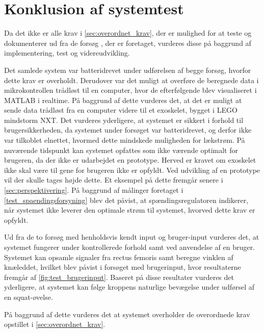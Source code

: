 \section{Konklusion af systemtest}
Da det ikke er alle krav i \autoref{sec:overordnet_krav}, der er mulighed for at teste og dokumenterer ud fra de forsøg , der er foretaget, vurderes disse på baggrund af implementering, test og videreudvikling. 

Det samlede system var batteridrevet under udførelsen af begge forsøg, hvorfor dette krav er overholdt. Derudover var det muligt at overføre de beregnede data i mikrokontrollen trådløst til en computer, hvor de efterfølgende blev visualiseret i MATLAB i realtime. På baggrund af dette vurderes det, at det er muligt at sende data trådløst fra en computer videre til et exoskelet, bygget i LEGO mindstorm NXT. Det vurderes yderligere, at systemet er sikkert i forhold til brugersikkerheden, da systemet under forsøget var batteridrevet, og derfor ikke var tilkoblet elnettet, hvormed dette mindskede muligheden for lækstrøm. 
På nuværende tidspunkt kan systemet opfattes som ikke værende optimalt for brugeren, da der ikke er udarbejdet en prototype. Herved er kravet om exoskelet ikke skal være til gene for brugeren ikke er opfyldt. Ved udvikling af en prototype vil der skulle tages højde dette. Et eksempel på dette fremgår senere i \autoref{sec:perspektivering}. 
På baggrund af målinger foretaget i \autoref{test_spaendingsforsyning} blev det påvist, at spændingsregulatoren indikerer, når systemet ikke leverer den optimale strøm til systemet, hvorved dette krav er opfyldt. 

Ud fra de to forsøg med henholdsvis kendt input og bruger-input vurderes det, at systemet fungerer under kontrollerede forhold samt ved anvendelse af en bruger. Systemet kan opsamle signaler fra rectus femoris samt beregne vinklen af knæleddet, hvilket blev påvist i forsøget med brugerinput, hvor resultaterne fremgår af \autoref{fig:test_brugerinput}. Baseret på disse resultater vurderes det yderligere, at systemet kan følge kroppens naturlige bevægelse under udførsel af en squat-øvelse. 

På baggrund af dette vurderes det at systemet overholder de overordnede krav opstillet i \autoref{sec:overordnet_krav}. 

